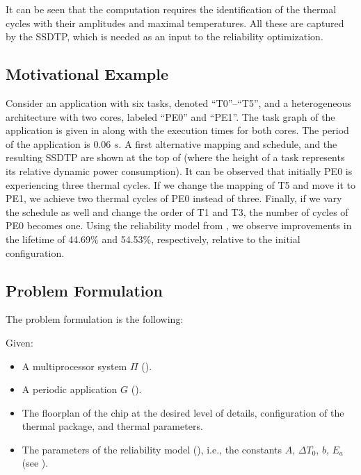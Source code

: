 It can be seen that the computation requires the identification of the thermal
cycles with their amplitudes and maximal temperatures. All these are captured by
the SSDTP, which is needed as an input to the reliability optimization.

\subsection{Motivational Example}

Consider an application with six tasks, denoted ``T0''--``T5'', and a
heterogeneous architecture with two cores, labeled ``PE0'' and ``PE1''. The task
graph of the application is given in  along with the execution
times for both cores. The period of the application is 0.06 $s$. A first
alternative mapping and schedule, and the resulting SSDTP are shown at the top
of  (where the height of a task represents its relative dynamic
power consumption). It can be observed that initially PE0 is experiencing three
thermal cycles. If we change the mapping of T5 and move it to PE1, we achieve
two thermal cycles of PE0 instead of three. Finally, if we vary the schedule as
well and change the order of T1 and T3, the number of cycles of PE0 becomes one.
Using the reliability model from , we observe
improvements in the lifetime of 44.69\% and 54.53\%, respectively, relative to
the initial configuration.

\subsection{Problem Formulation}

The problem formulation is the following:

Given:
\begin{itemize}

\item A multiprocessor system $\Pi$ ().

\item A periodic application $G$ ().

\item The floorplan of the chip at the desired level of details, configuration
of the thermal package, and thermal parameters.

\item The parameters of the reliability model (), i.e.,
the constants $A$, $\Delta T_0$, $b$, $E_a$ (see ).

\end{itemize}

